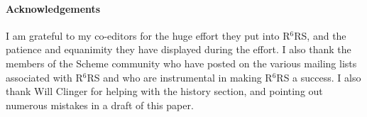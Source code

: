 \documentclass{sigplanconf}
\newcommand{\rn}[1]{R$^{#1}$RS}
\begin{document}
\paragraph*{Acknowledgements} I am grateful to my co-editors for the
huge effort they put into \rn{6}, and the patience and equanimity they
have displayed during the effort.  I also thank the members of the Scheme
community who have posted on the various mailing lists associated with
\rn{6} and who are instrumental in making \rn{6} a success.  I also
thank Will Clinger for helping with the history section, and
pointing out numerous mistakes in a draft of this paper.



\end{document}

